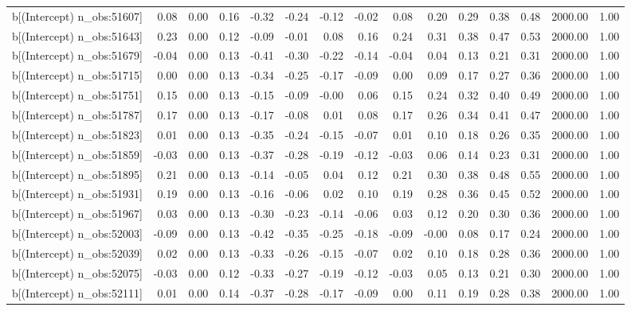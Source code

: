 \begin{table}[ht]
\begin{tabular}{rrrrrrrrrrrrrrr}
  b[(Intercept) n\_obs:51607] & 0.08 & 0.00 & 0.16 & -0.32 & -0.24 & -0.12 & -0.02 & 0.08 & 0.20 & 0.29 & 0.38 & 0.48 & 2000.00 & 1.00 \\ 
  b[(Intercept) n\_obs:51643] & 0.23 & 0.00 & 0.12 & -0.09 & -0.01 & 0.08 & 0.16 & 0.24 & 0.31 & 0.38 & 0.47 & 0.53 & 2000.00 & 1.00 \\ 
  b[(Intercept) n\_obs:51679] & -0.04 & 0.00 & 0.13 & -0.41 & -0.30 & -0.22 & -0.14 & -0.04 & 0.04 & 0.13 & 0.21 & 0.31 & 2000.00 & 1.00 \\ 
  b[(Intercept) n\_obs:51715] & 0.00 & 0.00 & 0.13 & -0.34 & -0.25 & -0.17 & -0.09 & 0.00 & 0.09 & 0.17 & 0.27 & 0.36 & 2000.00 & 1.00 \\ 
  b[(Intercept) n\_obs:51751] & 0.15 & 0.00 & 0.13 & -0.15 & -0.09 & -0.00 & 0.06 & 0.15 & 0.24 & 0.32 & 0.40 & 0.49 & 2000.00 & 1.00 \\ 
  b[(Intercept) n\_obs:51787] & 0.17 & 0.00 & 0.13 & -0.17 & -0.08 & 0.01 & 0.08 & 0.17 & 0.26 & 0.34 & 0.41 & 0.47 & 2000.00 & 1.00 \\ 
  b[(Intercept) n\_obs:51823] & 0.01 & 0.00 & 0.13 & -0.35 & -0.24 & -0.15 & -0.07 & 0.01 & 0.10 & 0.18 & 0.26 & 0.35 & 2000.00 & 1.00 \\ 
  b[(Intercept) n\_obs:51859] & -0.03 & 0.00 & 0.13 & -0.37 & -0.28 & -0.19 & -0.12 & -0.03 & 0.06 & 0.14 & 0.23 & 0.31 & 2000.00 & 1.00 \\ 
  b[(Intercept) n\_obs:51895] & 0.21 & 0.00 & 0.13 & -0.14 & -0.05 & 0.04 & 0.12 & 0.21 & 0.30 & 0.38 & 0.48 & 0.55 & 2000.00 & 1.00 \\ 
  b[(Intercept) n\_obs:51931] & 0.19 & 0.00 & 0.13 & -0.16 & -0.06 & 0.02 & 0.10 & 0.19 & 0.28 & 0.36 & 0.45 & 0.52 & 2000.00 & 1.00 \\ 
  b[(Intercept) n\_obs:51967] & 0.03 & 0.00 & 0.13 & -0.30 & -0.23 & -0.14 & -0.06 & 0.03 & 0.12 & 0.20 & 0.30 & 0.36 & 2000.00 & 1.00 \\ 
  b[(Intercept) n\_obs:52003] & -0.09 & 0.00 & 0.13 & -0.42 & -0.35 & -0.25 & -0.18 & -0.09 & -0.00 & 0.08 & 0.17 & 0.24 & 2000.00 & 1.00 \\ 
  b[(Intercept) n\_obs:52039] & 0.02 & 0.00 & 0.13 & -0.33 & -0.26 & -0.15 & -0.07 & 0.02 & 0.10 & 0.18 & 0.28 & 0.36 & 2000.00 & 1.00 \\ 
  b[(Intercept) n\_obs:52075] & -0.03 & 0.00 & 0.12 & -0.33 & -0.27 & -0.19 & -0.12 & -0.03 & 0.05 & 0.13 & 0.21 & 0.30 & 2000.00 & 1.00 \\ 
  b[(Intercept) n\_obs:52111] & 0.01 & 0.00 & 0.14 & -0.37 & -0.28 & -0.17 & -0.09 & 0.00 & 0.11 & 0.19 & 0.28 & 0.38 & 2000.00 & 1.00 \\ 

\end{tabular}
\end{table}
